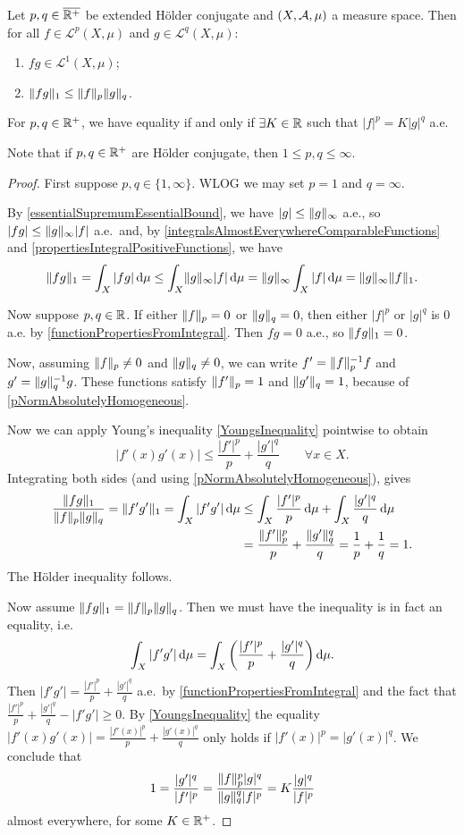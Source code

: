 \begin{theorem} \label{HoeldersInequality}
Let $p,q\in \overline{\mathbb{R}^+}$ be extended Hölder conjugate and $\sSet{X,\mathcal{A},\mu}$ a measure space. Then for all $f\in \mathcal{L}^p(X,\mu)$ and $g\in \mathcal{L}^q(X,\mu)$:
\begin{enumerate}
\item $fg\in \mathcal{L}^1(X,\mu)$;
\item $\lVert fg\rVert_1 \leq \lVert f\rVert_p\lVert g\rVert_q$.
\end{enumerate}
For $p,q\in \mathbb{R}^+$, we have equality \textup{if and only if} $\exists K\in \mathbb{R}$ such that $|f|^p = K|g|^q$ a.e.
\end{theorem}
Note that if $p,q\in\mathbb{R}^+$ are Hölder conjugate, then $1\leq p,q \leq \infty$.
\begin{proof}
First suppose $p,q\in \{1,\infty\}$. WLOG we may set $p = 1$ and $q = \infty$.

By \ref{essentialSupremumEssentialBound}, we have $|g| \leq \lVert g\rVert_\infty$ a.e., so $|fg| \leq \lVert g\rVert_\infty|f|$ a.e.\ and, by \ref{integralsAlmostEverywhereComparableFunctions} and \ref{propertiesIntegralPositiveFunctions}, we have
\[ \lVert fg\rVert_1 = \int_X |fg| \operatorname{d \!}{\mu} \leq \int_X \lVert g\rVert_\infty|f| \operatorname{d \!}{\mu} = \lVert g\rVert_\infty\int_X |f|\operatorname{d \!}{\mu} = \lVert g\rVert_\infty\lVert f\rVert_1. \]

Now suppose $p,q \in \mathbb{R}$.
If either $\lVert f\rVert_p = 0$ or $\lVert g\rVert_q = 0$, then either $|f|^p$ or $|g|^q$ is $0$ a.e. by \ref{functionPropertiesFromIntegral}. Then $fg = 0$ a.e., so $\lVert fg\rVert_1 = 0$.

Now, assuming $\lVert f\rVert_p \neq 0$ and $\lVert g\rVert_q \neq 0$, we can write $f' = \lVert f\rVert_p^{-1}f$ and $g' = \lVert g\rVert_q^{-1}g$.
These functions satisfy $\lVert f'\rVert_p = 1$ and $\lVert g'\rVert_q = 1$, because of \ref{pNormAbsolutelyHomogeneous}.

Now we can apply Young's inequality \ref{YoungsInequality} pointwise to obtain
\[ |f'(x)g'(x)| \leq \frac{|f'|^p}{p} + \frac{|g'|^q}{q} \qquad \forall x\in X. \]
Integrating both sides (and using \ref{pNormAbsolutelyHomogeneous}), gives
\begin{align*}
\frac{\lVert fg\rVert_1}{\lVert f\rVert_p\lVert g\rVert_q} = \lVert f'g'\rVert_1 = \int_X|f'g'|\operatorname{d \!}{\mu} &\leq \int_X\frac{|f'|^p}{p}\operatorname{d \!}{\mu} + \int_X\frac{|g'|^q}{q}\operatorname{d \!}{\mu} \\
&= \frac{\lVert f'\rVert_p^p}{p} + \frac{\lVert g'\rVert_q^q}{q} = \frac{1}{p} + \frac{1}{q} = 1.
\end{align*}
The Hölder inequality follows.

Now assume $\lVert fg\rVert_1 = \lVert f\rVert_p\lVert g\rVert_q$. Then we must have the inequality is in fact an equality, i.e.\ 
\[ \int_X|f'g'|\operatorname{d \!}{\mu} = \int_X\left(\frac{|f'|^p}{p} + \frac{|g'|^q}{q}\right)\operatorname{d \!}{\mu}. \]
Then $|f'g'| = \frac{|f'|^p}{p} + \frac{|g'|^q}{q}$ a.e.\ by \ref{functionPropertiesFromIntegral} and the fact that $\frac{|f'|^p}{p} + \frac{|g'|^q}{q} - |f'g'| \geq 0$. By \ref{YoungsInequality} the equality $|f'(x)g'(x)| = \frac{|f'(x)|^p}{p} + \frac{|g'(x)|^q}{q}$ only holds if $|f'(x)|^p = |g'(x)|^q$. We conclude that
\[ 1 = \frac{|g'|^q}{|f'|^p} = \frac{\lVert f\rVert_p^p |g|^q}{\lVert g\rVert_q^q |f|^p} = K \frac{|g|^q}{|f|^p} \]
almost everywhere, for some $K\in \mathbb{R}^+$.
\end{proof}
